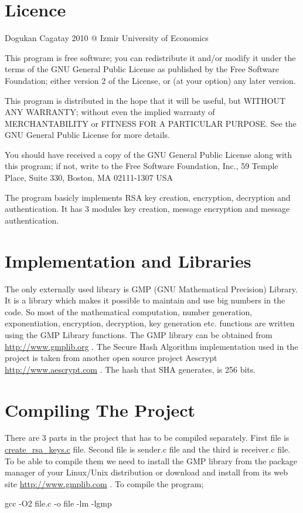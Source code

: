 \hypertarget{index_intro6}{}\section{Licence}\label{index_intro6}
Dogukan Cagatay 2010 @ Izmir University of Economics

This program is free software; you can redistribute it and/or modify it under the terms of the G\-N\-U General Public License as published by the Free Software Foundation; either version 2 of the License, or (at your option) any later version.

This program is distributed in the hope that it will be useful, but W\-I\-T\-H\-O\-U\-T A\-N\-Y W\-A\-R\-R\-A\-N\-T\-Y; without even the implied warranty of M\-E\-R\-C\-H\-A\-N\-T\-A\-B\-I\-L\-I\-T\-Y or F\-I\-T\-N\-E\-S\-S F\-O\-R A P\-A\-R\-T\-I\-C\-U\-L\-A\-R P\-U\-R\-P\-O\-S\-E. See the G\-N\-U General Public License for more details.

You should have received a copy of the G\-N\-U General Public License along with this program; if not, write to the Free Software Foundation, Inc., 59 Temple Place, Suite 330, Boston, M\-A 02111-\/1307 U\-S\-A

The program basicly implements R\-S\-A key creation, encryption, decryption and authentication. It has 3 modules key creation, message encryption and message authentication.\hypertarget{index_intro}{}\section{Implementation and Libraries}\label{index_intro}
The only externally used library is G\-M\-P (G\-N\-U Mathematical Precision) Library. It is a library which makes it possible to maintain and use big numbers in the code. So most of the mathematical computation, number generation, exponentiation, encryption, decryption, key generation etc. functions are written using the G\-M\-P Library functions. The G\-M\-P library can be obtained from \hyperlink{}{http\-://www.\-gmplib.\-org} . The Secure Hash Algorithm implementation used in the project is taken from another open source project Aescrypt \hyperlink{}{http\-://www.\-aescrypt.\-com} . The hash that S\-H\-A generates, is 256 bits.\hypertarget{index_intro2}{}\section{Compiling The Project}\label{index_intro2}
There are 3 parts in the project that has to be compiled separately. First file is \hyperlink{create__rsa__keys_8c}{create\-\_\-rsa\-\_\-keys.\-c} file. Second file is sender.\-c file and the third is receiver.\-c file. To be able to compile them we need to install the G\-M\-P library from the package manager of your Linux/\-Unix distribution or download and install from its web site \hyperlink{}{http\-://www.\-gmplib.\-com} . To compile the program; 
\begin{DoxyCode}
 gcc -O2 file.c -o file -lm -lgmp
\end{DoxyCode}


